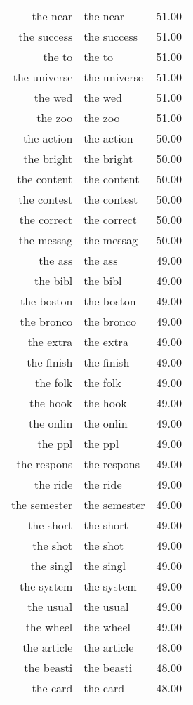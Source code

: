 \begin{table}[ht]
\begin{tabular}{rlr}
  the near & the near & 51.00 \\ 
  the success & the success & 51.00 \\ 
  the to & the to & 51.00 \\ 
  the universe & the universe & 51.00 \\ 
  the wed & the wed & 51.00 \\ 
  the zoo & the zoo & 51.00 \\ 
  the action & the action & 50.00 \\ 
  the bright & the bright & 50.00 \\ 
  the content & the content & 50.00 \\ 
  the contest & the contest & 50.00 \\ 
  the correct & the correct & 50.00 \\ 
  the messag & the messag & 50.00 \\ 
  the ass & the ass & 49.00 \\ 
  the bibl & the bibl & 49.00 \\ 
  the boston & the boston & 49.00 \\ 
  the bronco & the bronco & 49.00 \\ 
  the extra & the extra & 49.00 \\ 
  the finish & the finish & 49.00 \\ 
  the folk & the folk & 49.00 \\ 
  the hook & the hook & 49.00 \\ 
  the onlin & the onlin & 49.00 \\ 
  the ppl & the ppl & 49.00 \\ 
  the respons & the respons & 49.00 \\ 
  the ride & the ride & 49.00 \\ 
  the semester & the semester & 49.00 \\ 
  the short & the short & 49.00 \\ 
  the shot & the shot & 49.00 \\ 
  the singl & the singl & 49.00 \\ 
  the system & the system & 49.00 \\ 
  the usual & the usual & 49.00 \\ 
  the wheel & the wheel & 49.00 \\ 
  the article & the article & 48.00 \\ 
  the beasti & the beasti & 48.00 \\ 
  the card & the card & 48.00 \\ 

\end{tabular}
\end{table}
